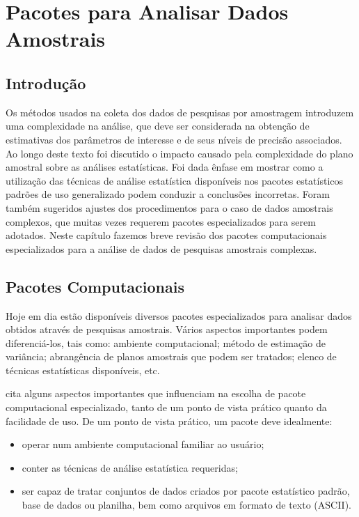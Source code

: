 \documentclass[]{book}
\numberwithin{example}{chapter}
\numberwithin{remark}{chapter}
\numberwithin{definition}{chapter}
\begin{document}
\chapter{Pacotes para Analisar Dados Amostrais}\label{pacotes}

\section{Introdução}\label{introducao-8}

Os métodos usados na coleta dos dados de pesquisas por amostragem
introduzem uma complexidade na análise, que deve ser considerada na
obtenção de estimativas dos parâmetros de interesse e de seus níveis de
precisão associados. Ao longo deste texto foi discutido o impacto
causado pela complexidade do plano amostral sobre as análises
estatísticas. Foi dada ênfase em mostrar como a utilização das técnicas
de análise estatística disponíveis nos pacotes estatísticos padrões de
uso generalizado podem conduzir a conclusões incorretas. Foram também
sugeridos ajustes dos procedimentos para o caso de dados amostrais
complexos, que muitas vezes requerem pacotes especializados para serem
adotados. Neste capítulo fazemos breve revisão dos pacotes
computacionais especializados para a análise de dados de pesquisas
amostrais complexas.

\section{Pacotes Computacionais}\label{pacotes-computacionais}

Hoje em dia estão disponíveis diversos pacotes especializados para
analisar dados obtidos através de pesquisas amostrais. Vários aspectos
importantes podem diferenciá-los, tais como: ambiente computacional;
método de estimação de variância; abrangência de planos amostrais que
podem ser tratados; elenco de técnicas estatísticas disponíveis, etc.

\citep{carlson} cita alguns aspectos importantes que influenciam na
escolha de pacote computacional especializado, tanto de um ponto de
vista prático quanto da facilidade de uso. De um ponto de vista prático,
um pacote deve idealmente:

\begin{itemize}
\item
  operar num ambiente computacional familiar ao usuário;
\item
  conter as técnicas de análise estatística requeridas;
\item
  ser capaz de tratar conjuntos de dados criados por pacote estatístico
  padrão, base de dados ou planilha, bem como arquivos em formato de
  texto (ASCII).
\end{itemize}
\end{document}
